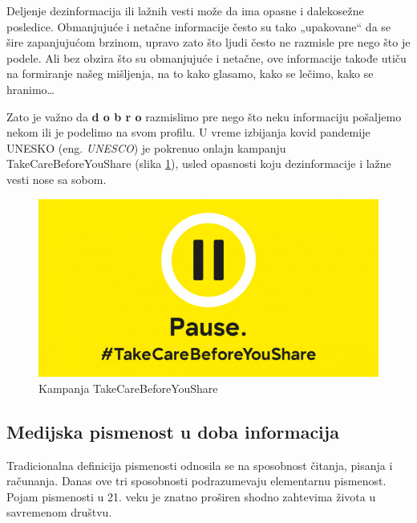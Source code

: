\documentclass[a4paper]{article}
\begin{document}
Deljenje dezinformacija ili lažnih vesti može da ima opasne i dalekosežne 
posledice. Obmanjujuće i netačne informacije često su tako „upakovane“ da se šire zapanjujućom brzinom, upravo zato što ljudi često ne razmisle pre nego što je podele. \newline
Ali bez obzira što su obmanjujuće i netačne, ove informacije takođe utiču na 
formiranje našeg mišljenja, na to kako glasamo, kako se lečimo, kako se hranimo… 



Zato je važno da \textbf{d o b r o} razmislimo pre nego što neku informaciju 
pošaljemo nekom ili je podelimo na svom profilu. 
U vreme izbijanja kovid pandemije UNESKO (eng. \emph{UNESCO}) je pokrenuo onlajn kampanju \newline
TakeCareBeforeYouShare \cite{unesco kampanja} (slika \ref{fig:takecarebeforeyoushare}), usled opasnosti koju dezinformacije i lažne vesti nose sa sobom. 

\begin{figure}[h!]
\begin{center}
\includegraphics[scale=0.4]{takecarebeforeyoushare.jpg}
\end{center}
\caption{Kampanja TakeCareBeforeYouShare}
\label{fig:takecarebeforeyoushare}
\end{figure}

\subsection{Medijska pismenost u doba informacija}
\label{sec:naslovN}

Tradicionalna definicija pismenosti odnosila se na sposobnost čitanja, pisanja i računanja. Danas ove tri sposobnosti podrazumevaju elementarnu pismenost. Pojam pismenosti u 21. veku je znatno proširen shodno zahtevima života u savremenom društvu.
\end{document}
